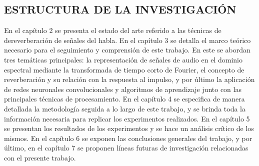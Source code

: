 \subsection[Estructura de la Investigación]{ESTRUCTURA DE LA INVESTIGACIÓN}
En el capítulo 2 se presenta el estado del arte referido a las técnicas de dereverberación de señales del habla. 
En el capítulo 3 se detalla el marco teórico necesario para el seguimiento y comprensión de este trabajo. En este se abordan tres temáticas principales: la representación de señales de audio en el dominio espectral mediante la transformada de tiempo corto de Fourier, el concepto de reverberación y su relación con la respuesta al impulso, y por último la aplicación de redes neuronales convolucionales y algoritmos de aprendizaje junto con las principales técnicas de procesamiento.  
En el capítulo 4 se especifica de manera detallada la metodología seguida a lo largo de este trabajo, y se brinda toda la información necesaria para replicar los experimentos realizados. 
En el capítulo 5 se presentan los resultados de los experimentos y se hace un análisis crítico de los mismos. 
En el capítulo 6 se exponen las conclusiones generales del trabajo, y por último, en el capítulo 7 se proponen líneas futuras de investigación relacionadas con el presente trabajo. 